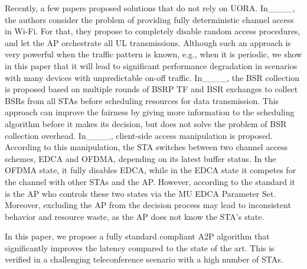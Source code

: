 Recently, a few papers proposed solutions that do not rely on UORA.
In____, the authors consider the problem of providing fully
deterministic channel access in Wi-Fi. For that, they propose to completely
disable random access procedures, and let the AP orchestrate all UL
transmissions. Although such an approach is very powerful when the traffic
pattern is known, e.g., when it is periodic, we show in this paper that it will
lead to significant performance degradation in scenarios with many devices with
unpredictable on-off traffic.
In____, the BSR collection is proposed based on multiple
rounds of BSRP TF and BSR exchanges to collect BSRs from all STAs before
scheduling resources for data transmission. This approach can improve the
fairness by giving more information to the scheduling algorithm before it makes
its decision, but does not solve the problem of BSR collection overhead.
In____, client-side access manipulation is proposed.
According to this manipulation, the STA switches between two channel access
schemes, EDCA and OFDMA, depending on its latest buffer status. In the OFDMA
state, it fully disables EDCA, while in the EDCA state it competes for the
channel with other STAs and the AP. However, according to the standard it is
the AP who controls these two states via the MU EDCA Parameter Set. Moreover,
excluding the AP from the decision process may lead to inconsistent behavior
and resource waste, as the AP does not know the STA's state.

In this paper, we propose a fully standard compliant A2P algorithm that
significantly improves the latency compared to the state of the art. This is
verified in a challenging teleconference scenario with a high number of STAs.